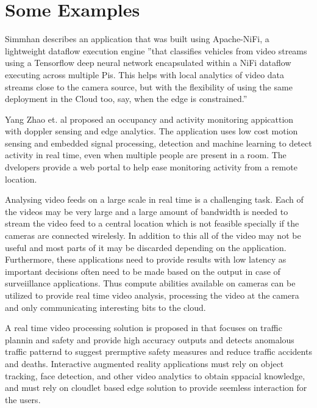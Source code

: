 \documentclass[sigconf]{acmart}
\begin{document}
\section{Some Examples}

Simmhan describes an application that was built using Apache-NiFi, a lightweight dataflow execution engine ''that classifies vehicles from video streams using a Tensorflow deep neural network encapsulated within a NiFi dataflow executing across multiple Pis. This helps with local analytics of video data streams close to the camera source, but with the flexibility of using the same deployment in the Cloud too, say, when the edge is constrained.''\cite{ieee_iot_cloud_analytics_newsletter}

Yang Zhao et. al proposed an occupancy and activity monitoring appicattion with doppler sensing and edge analytics. The application uses low cost motion sensing and embedded signal processing, detection and machine learning to detect activity in real time, even when multiple people are present in a room. The dvelopers provide a web portal to help ease monitoring activity from a remote location.\citep{Dolppler-usecase}

Analysing video feeds on a large scale in real time is a challenging task. Each of the videos may be very large and a large amount of bandwidth is needed to stream the video feed to a central location which is not feasible specially if the cameras are connected wirelesly. In addition to this all of the video may not be useful and most parts of it may be discarded depending on the application. Furthermore, these applications need to provide results with low latency as important decisions often need to be made based on the output in case of surveiillance applications.\cite{rocket-real-time-video} Thus compute abilities available on cameras can be utilized to provide real time video analysis, processing the video at the camera and only communicating interesting bits to the cloud.\cite{satyanarayananemergence}

A real time video processing solution is proposed in \cite{rocket-real-time-video} that focuses on traffic plannin and safety and provide high accuracy outputs and detects anomalous traffic patternd to suggest prermptive safety measures and reduce traffic accidents and deaths.
Interactive augmented reality applications must rely on object tracking, face detection, and other video analytics to obtain sppacial knowledge, and must rely on cloudlet based edge solution to provide seemless interaction for the users.\cite{rocket-real-time-video}
\end{document}

